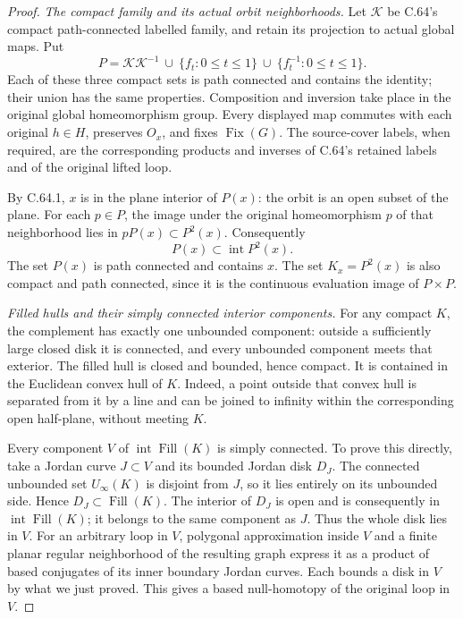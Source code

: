 \begin{proof}
\emph{The compact family and its actual orbit neighborhoods.}
Let $\mathcal K$ be C.64's compact path-connected labelled
family, and retain its projection to actual global maps.
Put
\[
 P=\mathcal K\mathcal K^{-1}
        \ \cup\ \{f_t:0\leq t\leq1\}
        \ \cup\ \{f_t^{-1}:0\leq t\leq1\}.
                                                               \tag{C.70.6}
\]
Each of these three compact sets is path connected and
contains the identity; their union has the same properties.
Composition and inversion take place in the original global
homeomorphism group. Every displayed map commutes with each
original $h\in H$, preserves $O_x$, and fixes $\operatorname{Fix}(G)$.
The source-cover labels, when required, are the corresponding
products and inverses of C.64's retained labels and of the
original lifted loop.

By C.64.1, $x$ is in the plane interior of $P(x)$:
the orbit is an open subset of the plane. For each $p\in P$,
the image under the original homeomorphism $p$ of that
neighborhood lies in $pP(x)\subset P^2(x)$.
Consequently
\[
                   P(x)\subset\operatorname{int}P^2(x).
                                                               \tag{C.70.7}
\]
The set $P(x)$ is path connected and contains $x$.
The set $K_x=P^2(x)$ is also compact and path connected,
since it is the continuous evaluation image of $P\times P$.

\emph{Filled hulls and their simply connected interior components.}
For any compact $K$, the complement has exactly one
unbounded component: outside a sufficiently large closed
disk it is connected, and every unbounded component meets
that exterior. The filled hull is closed and bounded, hence
compact. It is contained in the Euclidean convex hull of $K$.
Indeed, a point outside that convex hull is separated from
it by a line and can be joined to infinity within the
corresponding open half-plane, without meeting $K$.

Every component $V$ of $\operatorname{int}\operatorname{Fill}(K)$
is simply connected. To prove this directly, take a Jordan
curve $J\subset V$ and its bounded Jordan disk $D_J$.
The connected unbounded set $U_\infty(K)$ is disjoint from
$J$, so it lies entirely on its unbounded side. Hence
$D_J\subset\operatorname{Fill}(K)$. The interior of
$D_J$ is open and is consequently in
$\operatorname{int}\operatorname{Fill}(K)$; it belongs
to the same component as $J$. Thus the whole disk lies in $V$.
For an arbitrary loop in $V$, polygonal approximation
inside $V$ and a finite planar regular neighborhood of
the resulting graph express it as a product of based
conjugates of its inner boundary Jordan curves. Each
bounds a disk in $V$ by what we just proved. This gives
a based null-homotopy of the original loop in $V$.


\end{proof}
